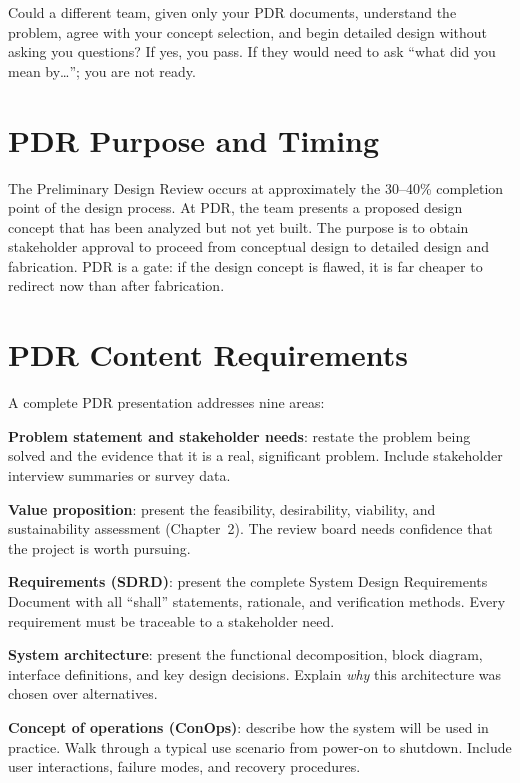 \documentclass[11pt,letterpaper,twoside,openany]{book}
\begin{document}
\begin{tipbox}
Could a different team, given only your PDR documents, understand the problem, agree with your concept selection, and begin detailed design without asking you questions? If yes, you pass. If they would need to ask ``what did you mean by\ldots''; you are not ready.
\end{tipbox}

\section{PDR Purpose and Timing}
The Preliminary Design Review occurs at approximately the 30--40\% completion point of the design process. At PDR, the team presents a proposed design concept that has been analyzed but not yet built. The purpose is to obtain stakeholder approval to proceed from conceptual design to detailed design and fabrication. PDR is a gate: if the design concept is flawed, it is far cheaper to redirect now than after fabrication.

\section{PDR Content Requirements}
A complete PDR presentation addresses nine areas:

\textbf{Problem statement and stakeholder needs}: restate the problem being solved and the evidence that it is a real, significant problem. Include stakeholder interview summaries or survey data.

\textbf{Value proposition}: present the feasibility, desirability, viability, and sustainability assessment (Chapter~2). The review board needs confidence that the project is worth pursuing.

\textbf{Requirements (SDRD)}: present the complete System Design Requirements Document with all ``shall'' statements, rationale, and verification methods. Every requirement must be traceable to a stakeholder need.

\textbf{System architecture}: present the functional decomposition, block diagram, interface definitions, and key design decisions. Explain \emph{why} this architecture was chosen over alternatives.

\textbf{Concept of operations (ConOps)}: describe how the system will be used in practice. Walk through a typical use scenario from power-on to shutdown. Include user interactions, failure modes, and recovery procedures.
\end{document}
